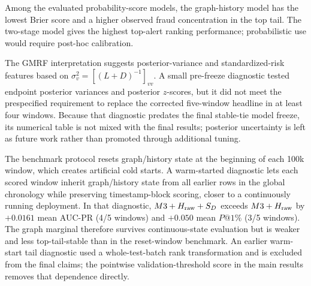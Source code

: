 \documentclass[11pt]{article}
\theoremstyle{definition}
\theoremstyle{remark}
\begin{document}
\begin{table}[h]
\centering
\caption{Mean calibration diagnostics over five block-causal windows.}
\label{tab:calibration}
\end{table}

Among the evaluated probability-score models, the graph-history model has the lowest Brier score and a higher observed fraud concentration in the top tail. The two-stage model gives the highest top-alert ranking performance; probabilistic use would require post-hoc calibration.

The GMRF interpretation suggests posterior-variance and standardized-risk features based on $\sigma_v^2=[(L+D)^{-1}]_{vv}$. A small pre-freeze diagnostic tested endpoint posterior variances and posterior $z$-scores, but it did not meet the prespecified requirement to replace the corrected five-window headline in at least four windows. Because that diagnostic predates the final stable-tie model freeze, its numerical table is not mixed with the final results; posterior uncertainty is left as future work rather than promoted through additional tuning.

The benchmark protocol resets graph/history state at the beginning of each 100k window, which creates artificial cold starts. A warm-started diagnostic lets each scored window inherit graph/history state from all earlier rows in the global chronology while preserving timestamp-block scoring, closer to a continuously running deployment. In that diagnostic, $M3+H_{\rm raw}+S_D$ exceeds $M3+H_{\rm raw}$ by $+0.0161$ mean AUC-PR (4/5 windows) and $+0.050$ mean $P@1\%$ (3/5 windows). The graph marginal therefore survives continuous-state evaluation but is weaker and less top-tail-stable than in the reset-window benchmark. An earlier warm-start tail diagnostic used a whole-test-batch rank transformation and is excluded from the final claims; the pointwise validation-threshold score in the main results removes that dependence directly.
\end{document}
